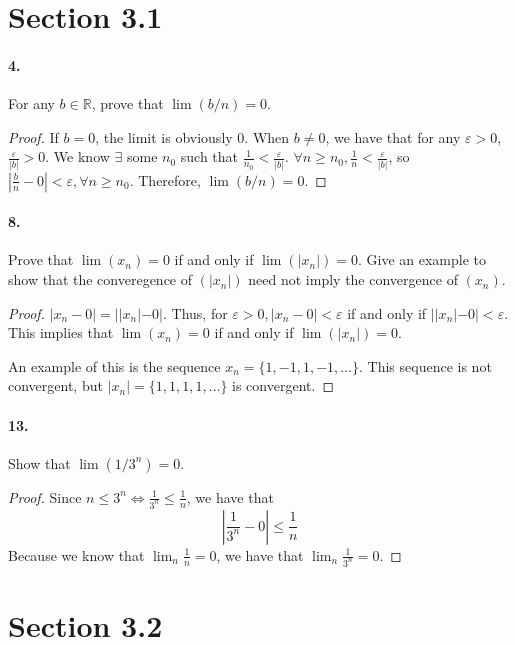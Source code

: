 \documentclass[12pt]{article}
\newcommand\R{\mathbb{R}}
\theoremstyle{remark}
\begin{document}
\section*{Section 3.1}
\paragraph{4.} For any $b \in \R$, prove that $\lim(b / n) = 0$. 
\begin{proof}
    If $b = 0$, the limit is obviously 0. When $b \neq 0$, we have that for any $\varepsilon > 0$, $\frac{\varepsilon}{|b|} > 0$. We know $\exists$ some $n_0$ such that $\frac{1}{n_0} < \frac{\varepsilon}{|b|}$. $\forall n \geq n_0, \frac{1}{n} < \frac{\varepsilon}{|b|}$, so $|\frac{b}{n} - 0| < \varepsilon, \forall n \geq n_0$. Therefore, $\lim(b / n) = 0$.
\end{proof}

\paragraph{8.} Prove that $\lim(x_n) = 0$ if and only if $\lim(|x_n|) = 0$. Give an example to show that the converegence of $(|x_n|)$ need not imply the convergence of $(x_n)$. 
\begin{proof}
    $|x_n - 0| = ||x_n| - 0|$. Thus, for $\varepsilon > 0, |x_n - 0| < \varepsilon$ if and only if $||x_n| - 0| < \varepsilon$. This implies that $\lim(x_n) = 0$ if and only if $\lim(|x_n|) = 0$.

    An example of this is the sequence $x_n = \{1, -1, 1, -1, \dots\}$. This sequence is not convergent, but $|x_n| = \{1, 1, 1, 1, \dots\}$ is convergent.
\end{proof}

\paragraph{13.} Show that $\lim(1/3^n) = 0$. 
\begin{proof}
    Since $n \leq 3^n \iff \frac{1}{3^n} \leq \frac{1}{n}$, we have that $$ |\frac{1}{3^n} - 0| \leq \frac{1}{n} $$ Because we know that $\lim_n \frac{1}{n} = 0$, we have that $\lim_n \frac{1}{3^n} = 0$.
\end{proof}

\section*{Section 3.2}
\end{document}

